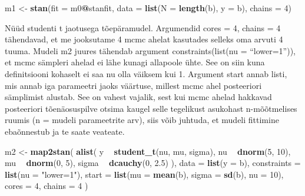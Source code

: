 \documentclass[]{book}
\newenvironment{Shaded}{\begin{snugshade}}{\end{snugshade}}
\newcommand{\DataTypeTok}[1]{\textcolor[rgb]{0.13,0.29,0.53}{#1}}
\newcommand{\DecValTok}[1]{\textcolor[rgb]{0.00,0.00,0.81}{#1}}
\newcommand{\FloatTok}[1]{\textcolor[rgb]{0.00,0.00,0.81}{#1}}
\newcommand{\KeywordTok}[1]{\textcolor[rgb]{0.13,0.29,0.53}{\textbf{#1}}}
\newcommand{\NormalTok}[1]{#1}
\newcommand{\OperatorTok}[1]{\textcolor[rgb]{0.81,0.36,0.00}{\textbf{#1}}}
\newcommand{\StringTok}[1]{\textcolor[rgb]{0.31,0.60,0.02}{#1}}
\begin{document}
\begin{Shaded}
\begin{Highlighting}[]
\NormalTok{m1 <-}\StringTok{ }\KeywordTok{stan}\NormalTok{(}\DataTypeTok{fit =}\NormalTok{ m0}\OperatorTok{@}\NormalTok{stanfit,}
           \DataTypeTok{data =} \KeywordTok{list}\NormalTok{(}\DataTypeTok{N =} \KeywordTok{length}\NormalTok{(b), }
                       \DataTypeTok{y =}\NormalTok{ b),}
           \DataTypeTok{chains =} \DecValTok{4}\NormalTok{)}
\end{Highlighting}
\end{Shaded}

Nüüd studenti t jaotusega tõepäramudel.
Argumendid cores = 4, chains = 4 tähendavad, et me jooksutame 4 mcmc ahelat kasutades selleks oma arvuti 4 tuuma.
Mudeli m2 juures tähendab argument constraints(list(nu = ``lower=1'')), et mcmc sämpleri ahelad ei lähe kunagi allapoole ühte.
See on siin kuna definitsiooni kohaselt ei saa nu olla väiksem kui 1.
Argument start annab listi, mis annab iga parameetri jaoks väärtuse, millest mcmc ahel posteeriori sämplimist alustab. See on vahest vajalik, sest kui mcmc ahelad hakkavad posteeriori tõenäosuspilve otsima kaugel selle tegelikust asukohast n-mõõtmelises ruumis (n = mudeli parameetrite arv), siis võib juhtuda, et mudeli fittimine ebaõnnestub ja te saate veateate.

\begin{Shaded}
\begin{Highlighting}[]
\NormalTok{m2 <-}\StringTok{ }\KeywordTok{map2stan}\NormalTok{(}
  \KeywordTok{alist}\NormalTok{(}
\NormalTok{    y }\OperatorTok{~}\StringTok{ }\KeywordTok{student_t}\NormalTok{(nu, mu, sigma),}
\NormalTok{    nu }\OperatorTok{~}\StringTok{ }\KeywordTok{dnorm}\NormalTok{(}\DecValTok{5}\NormalTok{, }\DecValTok{10}\NormalTok{), }
\NormalTok{    mu }\OperatorTok{~}\StringTok{ }\KeywordTok{dnorm}\NormalTok{(}\DecValTok{0}\NormalTok{, }\DecValTok{5}\NormalTok{),}
\NormalTok{    sigma }\OperatorTok{~}\StringTok{ }\KeywordTok{dcauchy}\NormalTok{(}\DecValTok{0}\NormalTok{, }\FloatTok{2.5}\NormalTok{)}
\NormalTok{    ),}
  \DataTypeTok{data =} \KeywordTok{list}\NormalTok{(}\DataTypeTok{y =}\NormalTok{ b),}
  \DataTypeTok{constraints =} \KeywordTok{list}\NormalTok{(}\DataTypeTok{nu =} \StringTok{"lower=1"}\NormalTok{),}
  \DataTypeTok{start =} \KeywordTok{list}\NormalTok{(}\DataTypeTok{mu =} \KeywordTok{mean}\NormalTok{(b), }\DataTypeTok{sigma =} \KeywordTok{sd}\NormalTok{(b), }\DataTypeTok{nu =} \DecValTok{10}\NormalTok{),}
  \DataTypeTok{cores =} \DecValTok{4}\NormalTok{,}
  \DataTypeTok{chains =} \DecValTok{4}
\NormalTok{)}
\end{Highlighting}
\end{Shaded}
\end{document}

